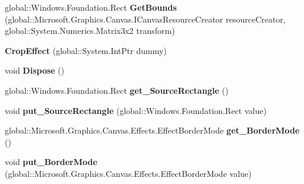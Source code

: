 \begin{DoxyCompactItemize}
global\+::\+Windows.\+Foundation.\+Rect {\bfseries Get\+Bounds} (global\+::\+Microsoft.\+Graphics.\+Canvas.\+I\+Canvas\+Resource\+Creator resource\+Creator, global\+::\+System.\+Numerics.\+Matrix3x2 transform)
\item 
\mbox{\label{class_microsoft_1_1_graphics_1_1_canvas_1_1_effects_1_1_crop_effect_a0c77e082f46f52291276ece0f7fae253}} 
{\bfseries Crop\+Effect} (global\+::\+System.\+Int\+Ptr dummy)
\item 
\mbox{\label{class_microsoft_1_1_graphics_1_1_canvas_1_1_effects_1_1_crop_effect_a9b3ea35f19a680f460f21d9a9e788048}} 
void {\bfseries Dispose} ()
\item 
\mbox{\label{class_microsoft_1_1_graphics_1_1_canvas_1_1_effects_1_1_crop_effect_a7623c2c77a5d02cdfdd9c57daadea17b}} 
global\+::\+Windows.\+Foundation.\+Rect {\bfseries get\+\_\+\+Source\+Rectangle} ()
\item 
\mbox{\label{class_microsoft_1_1_graphics_1_1_canvas_1_1_effects_1_1_crop_effect_a1d926a1f046dba84ddf63f41d43adb8d}} 
void {\bfseries put\+\_\+\+Source\+Rectangle} (global\+::\+Windows.\+Foundation.\+Rect value)
\item 
\mbox{\label{class_microsoft_1_1_graphics_1_1_canvas_1_1_effects_1_1_crop_effect_ad455f8e79c452f9b75bdc6cce955b14c}} 
global\+::\+Microsoft.\+Graphics.\+Canvas.\+Effects.\+Effect\+Border\+Mode {\bfseries get\+\_\+\+Border\+Mode} ()
\item 
\mbox{\label{class_microsoft_1_1_graphics_1_1_canvas_1_1_effects_1_1_crop_effect_a44f8835555e034c842513c801cfdf55f}} 
void {\bfseries put\+\_\+\+Border\+Mode} (global\+::\+Microsoft.\+Graphics.\+Canvas.\+Effects.\+Effect\+Border\+Mode value)
\item 
\mbox{\label{class_microsoft_1_1_graphics_1_1_canvas_1_1_effects_1_1_crop_effect_abe38d9ad2be28d73b379306d36c91530}} 

\end{DoxyCompactItemize}

